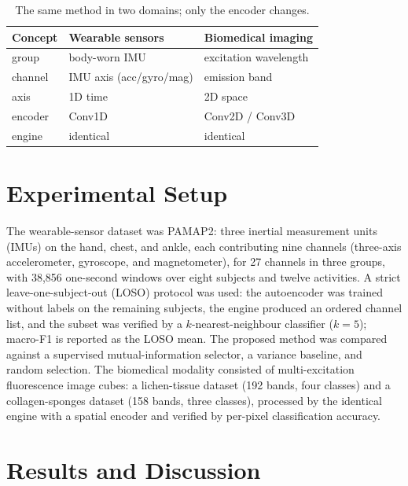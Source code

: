 \documentclass[conference]{IEEEtran}
\begin{document}
\begin{table}[t]
\caption{The same method in two domains; only the encoder changes.}
\label{tab:crossdomain}
\centering
\footnotesize
\setlength{\tabcolsep}{4pt}
\renewcommand{\arraystretch}{1.1}
\begin{tabular}{@{}lll@{}}
\toprule
Concept & Wearable sensors & Biomedical imaging \\
\midrule
group   & body-worn IMU            & excitation wavelength \\
channel & IMU axis (acc/gyro/mag)  & emission band \\
axis    & 1D time                  & 2D space \\
encoder & Conv1D                   & Conv2D / Conv3D \\
engine  & identical                & identical \\
\bottomrule
\end{tabular}
\end{table}

\section{Experimental Setup}
The wearable-sensor dataset was PAMAP2: three inertial measurement units (IMUs) on
the hand, chest, and ankle, each contributing nine channels (three-axis
accelerometer, gyroscope, and magnetometer), for 27 channels in three groups, with
38{,}856 one-second windows over eight subjects and twelve activities. A strict
leave-one-subject-out (LOSO) protocol was used: the autoencoder was trained without
labels on the remaining subjects, the engine produced an ordered channel list, and
the subset was verified by a $k$-nearest-neighbour classifier ($k{=}5$); macro-F1
is reported as the LOSO mean. The proposed method was compared against a supervised
mutual-information selector, a variance baseline, and random selection. The
biomedical modality consisted of multi-excitation fluorescence image cubes: a
lichen-tissue dataset (192 bands, four classes) and a collagen-sponges dataset (158
bands, three classes), processed by the identical engine with a spatial encoder and
verified by per-pixel classification accuracy.

\section{Results and Discussion}
\end{document}
